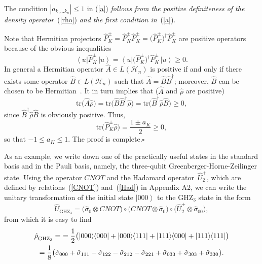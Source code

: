 \documentclass[12pt,a4paper,twoside]{article}      %
\newcommand{\ket}[1] {{\ensuremath{\left|#1\right\rangle}}}
\newcommand{\bra}[1] {{\ensuremath{\left\langle#1\right|}}}
\newcommand{\ketbra}[2]{{\ensuremath {\left|#1\right\rangle\!\;\!\!\left\langle#2\right|}}}
\begin{document}
{\proposition
The condition $|a_{k_1\ldots{}k_n}|\leqslant1$ in} (\ref{a}) {\it follows from the positive definiteness of the density operator}~(\ref{rho}) {\it and the first condition in}~(\ref{a}).

Note that Hermitian projectors $\hat{P}^{\pm}_{K}= \hat{P}^{\pm}_{K}\hat{P}^{\pm}_{K}= \big(\hat{P}^{\pm}_{K}\big)^{\!\dag}\hat{P}^{\pm}_{K}$ are positive operators because of the obvious inequalities
\begin{equation}\label{}
\bra{u}\hat{P}^{\pm}_{K}\,\ket{u}= \bra{u}\big(\hat{P}^{\pm}_{K}\big)^{\!\dag} \hat{P}^{\pm}_{K}\,\ket{u}\geqslant0. \nonumber
\end{equation}
In general a Hermitian operator $\hat{A}\in L(\mathcal{H}_n)$ is positive if and only if there exists some operator $\hat{B}\in L(\mathcal{H}_n)$ such that $\hat{A}=\hat{B}\hat{B}^\dag$; moreover, $\hat{B}$ can be chosen to be Hermitian~\cite{Bengtsson2006}. It in turn implies that ($\hat{A}$ and $\hat{\rho}$ are positive)
\begin{equation}\label{}
\mathrm{tr}\big(\hat{A}\hat{\rho}\big)= \mathrm{tr}\big(\hat{B}\hat{B}^\dag\hat{\rho}\big)= \mathrm{tr}\big(\hat{B}^\dag\hat{\rho}\hat{B}\big) \geqslant0, \nonumber
\end{equation}
since $\hat{B}^\dag\hat{\rho}\hat{B}$ is obviously positive. Thus,
\begin{equation}\label{Prho}
\mathrm{tr}\big(\hat{P}^{\pm}_{K}\hat{\rho}\big)= \frac{1\pm{}a_K}{2}\geqslant0,
\end{equation}
so that $-1\leqslant{}a_K\leqslant1$. The proof is complete.\;$\square$

As an example, we write down one of the practically useful states in the standard basis and in the Pauli basis, namely, the three-qubit Greenberger-Horne-Zeilinger state. Using the operator $CNOT$ and the Hadamard operator~$\hat{U}_2^+$, which are defined by relations~(\ref{CNOT}) and~(\ref{Had}) in Appendix A2, we can write the unitary transformation of the initial state $\ket{000}$ to the $\mathrm{GHZ}_3$ state in the form
\begin{equation}\label{}
\hat{U}_{\mathrm{GHZ}_3}= \big(\hat{\sigma}_{0}\otimes{}CNOT\big)\!\circ\! \big(CNOT\otimes\hat{\sigma}_{0}\big)\!\circ\! \big(\hat{U}_2^+\otimes\hat{\sigma}_{00}\big),
\nonumber
\end{equation}
from which it is easy to find
\begin{multline}\label{}
\hat{\rho}_{\vphantom{\hat{A}}\mathrm{GHZ}_3}= \
=\frac{1}{2}\big(\ketbra{000}{000}+ \ketbra{000}{111}+ \ketbra{111}{000}+ \ketbra{111}{111}\big)\\
={\frac{1}{8}} \big(\hat{\sigma}_{000} + \hat{\sigma}_{111} - \hat{\sigma}_{122} - \hat{\sigma}_{212} - \hat{\sigma}_{221} + \hat{\sigma}_{033} + \hat{\sigma}_{303} + \hat{\sigma}_{330}\big).
\nonumber
\end{multline}
\end{document}
